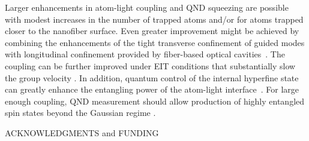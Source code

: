 \documentclass[aps,pra,twocolumn]{revtex4-1} %
\begin{document}
Larger enhancements in atom-light coupling and QND squeezing are possible with modest increases in the number of trapped atoms and/or for atoms trapped closer to the nanofiber surface.  
Even greater improvement might be achieved by combining the enhancements of the tight transverse confinement of guided modes with longitudinal confinement provided by fiber-based optical cavities~\cite{le_kien_intracavity_2009, wuttke_nanofiber_2012, yalla_cavity_2014, bohnet_reduced_2014,nayak_optical_2014}.  
The coupling can be further improved under EIT conditions that substantially slow the group velocity \cite{gouraud_demonstration_2015, sayrin_storage_2015, kumar_autler-townes_2015, le_kien_electromagnetically_2015}. 
In addition, quantum control of the internal hyperfine state \cite{smith_quantum_2013-1} can greatly enhance the entangling power of the atom-light interface~\cite{trail_strongly_2010, norris_enhanced_2012}. 
For large enough coupling, QND measurement should allow production of highly entangled spin states beyond the Gaussian regime \cite{stockton_deterministic_2004, mcconnell_entanglement_2015}.

ACKNOWLEDGMENTS and FUNDING

%
%


\end{document}
